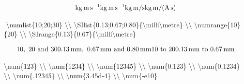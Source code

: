 \documentclass{book}
\newenvironment{Shaded}{}{}
\newcommand{\FunctionTok}[1]{\textcolor[rgb]{0.02,0.16,0.49}{#1}}
\newcommand{\NormalTok}[1]{#1}
\newcommand{\SpecialCharTok}[1]{\textcolor[rgb]{0.25,0.44,0.63}{#1}}
\newcommand{\SpecialStringTok}[1]{\textcolor[rgb]{0.73,0.40,0.53}{#1}}
\begin{document}
\[
  \si{kg.m.s^{-1}}                \\
  \si{\kilogram\metre\per\second} \\
  \si[per-mode=symbol]
    {\kilogram\metre\per\second}  \\
  \si[per-mode=symbol]
    {\kilogram\metre\per\ampere\per\second}
\]

\begin{Shaded}
\begin{Highlighting}[]
\SpecialStringTok{$$}
\SpecialStringTok{  }\SpecialCharTok{\textbackslash{}numlist}\SpecialStringTok{\{10;20;30\}                    }\SpecialCharTok{\textbackslash{}\textbackslash{}}
\SpecialStringTok{  }\SpecialCharTok{\textbackslash{}SIlist}\SpecialStringTok{\{0.13;0.67;0.80\}\{}\SpecialCharTok{\textbackslash{}milli\textbackslash{}metre}\SpecialStringTok{\} }\SpecialCharTok{\textbackslash{}\textbackslash{}}
\SpecialStringTok{  }\SpecialCharTok{\textbackslash{}numrange}\SpecialStringTok{\{10\}\{20\}                     }\SpecialCharTok{\textbackslash{}\textbackslash{}}
\SpecialStringTok{  }\SpecialCharTok{\textbackslash{}SIrange}\SpecialStringTok{\{0.13\}\{0.67\}\{}\SpecialCharTok{\textbackslash{}milli\textbackslash{}metre}\SpecialStringTok{\}}
\SpecialStringTok{$$}
\end{Highlighting}
\end{Shaded}

\[
  \numlist{10;20;30}                    \\
  \SIlist{0.13;0.67;0.80}{\milli\metre} \\
  \numrange{10}{20}                     \\
  \SIrange{0.13}{0.67}{\milli\metre}
\]

\begin{Shaded}
\begin{Highlighting}[]
  \FunctionTok{\textbackslash{}num}\NormalTok{\{123\}     }\FunctionTok{\textbackslash{}\textbackslash{}}
  \FunctionTok{\textbackslash{}num}\NormalTok{\{1234\}    }\FunctionTok{\textbackslash{}\textbackslash{}}
  \FunctionTok{\textbackslash{}num}\NormalTok{\{12345\}   }\FunctionTok{\textbackslash{}\textbackslash{}}
  \FunctionTok{\textbackslash{}num}\NormalTok{\{0.123\}   }\FunctionTok{\textbackslash{}\textbackslash{}}
  \FunctionTok{\textbackslash{}num}\NormalTok{\{0,1234\}  }\FunctionTok{\textbackslash{}\textbackslash{}}
  \FunctionTok{\textbackslash{}num}\NormalTok{\{.12345\}  }\FunctionTok{\textbackslash{}\textbackslash{}}
  \FunctionTok{\textbackslash{}num}\NormalTok{\{3.45d{-}4\} }\FunctionTok{\textbackslash{}\textbackslash{}}
  \FunctionTok{\textbackslash{}num}\NormalTok{\{{-}e10\}}
\end{Highlighting}
\end{Shaded}
\end{document}
